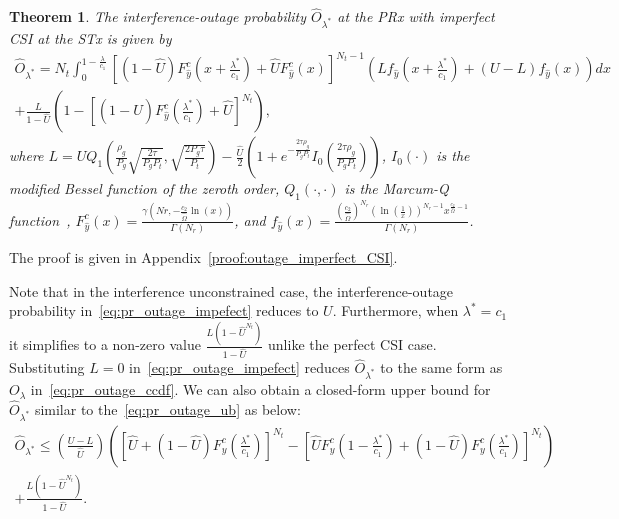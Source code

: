 \documentclass[12pt,draftcls,peerreview,onecolumn]{IEEEtran}
\newtheorem{theorem}{{\bf Theorem}}
\newcommand{\lam}{\lambda}
\newcommand{\lamstar}{\lam^{*}}
\newcommand{\Nt}{{N_t}}
\newcommand{\Nr}{{N_r}}
\newcommand{\Pt}{{P_t}}
\newcommand{\itau}{\tau}
\newcommand{\cone}{c_{1}}
\newcommand{\ctwo}{c_{2}}
\newcommand{\out}{O}
\newcommand{\m}{\cone}
\newcommand{\lambym}{\frac{\lam}{\m}}
\newcommand{\lamstarbym}{\frac{\lamstar}{\m}}
\newcommand{\al}{\ctwo}
\newcommand{\snr}{\Omega}
\newcommand{\un}{U}
\newcommand{\outlam}{\out_{\lam}}
\newcommand{\outhatlamstar}{\widehat{\out}_{\lam^*}}
\newcommand{\unhat}{\widehat{\un}}
\newcommand{\snrhat}{\widehat{\snr}}
\newcommand{\gpilotpower}{P_g}
\newcommand{\yhat}{\hat{y}}
\newcommand{\Probglt}{L}
\newcommand{\albysnrhat}[1][]{\frac{\al#1}{\snrhat}}
\newcommand{\rhog}{\rho_g}
\begin{document}
\begin{theorem}
\label{thm:outage_imperfect_CSI}
The interference-outage probability $\outhatlamstar$ at the PRx with imperfect CSI at the STx is given by
\begin{multline}
\label{eq:pr_outage_impefect} 
\!\outhatlamstar \!=\! \Nt \!\int_{0}^{1-\lambym} 	
\!\left[\left(1 -\unhat\right)F_{\yhat}^{c}\left(x+\lamstarbym\right) + \unhat F_{\yhat}^{c}\left(x\right)\right]^{\Nt-1}\!\! \left(\! \Probglt f_{\yhat}\!\left(\! x+\lamstarbym\right) \!+\! (\un - \Probglt) f_{\yhat}\left(x\right)\!\right) dx\\
+ \frac{ \Probglt}{1 - \unhat} \left( 1 - \left[ \left(1 -\unhat\right)F_{\yhat}^{c}\left(\lamstarbym\right) + \unhat \right]^{\Nt}  \right) ,
\end{multline}
%
where $\Probglt = \un Q_1\left(\frac{\rhog}{ \gpilotpower} \sqrt{\frac{2\itau}{ \gpilotpower\Pt}},\sqrt{\frac{2 \gpilotpower\itau}{\Pt}}\right)  - \frac{\unhat}{2} \left( 1 + e^{-\frac{2\itau\rhog}{ \gpilotpower\Pt}}I_{0}\left(\frac{2\itau\rhog}{ \gpilotpower\Pt} \right) \right)$, $I_{0}(\cdot)$ is the modified Bessel function of the zeroth order,  $Q_1(\cdot,\cdot)$ is the Marcum-Q function~\cite[(4.34)]{simon_alouini_book}, $F_{\yhat}^{c}\left(x\right) = \frac{\gamma\left(Nr,-\albysnrhat[]\ln(x)\right)}{\Gamma(\Nr)}$, and $f_{\yhat}\left( x\right) = \frac{ \left( \albysnrhat \right)^{\Nr} \left(\ln\left(\frac{1}{x} \right)\right)^{\Nr-1} x^{\albysnrhat - 1}}{\Gamma(\Nr)}$.
\end{theorem}
%
\begin{IEEEproof}
	The proof is given in Appendix~\ref{proof:outage_imperfect_CSI}.
\end{IEEEproof}
%
Note that in the interference unconstrained case, the interference-outage probability in~\eqref{eq:pr_outage_impefect} reduces to $\un$. Furthermore, when $\lamstar=\cone$ it simplifies to a non-zero value $\frac{ \Probglt \left( 1-\unhat^{\Nt}\right) }{1-\unhat}$ unlike the perfect CSI case. Substituting $\Probglt=0$ in~\eqref{eq:pr_outage_impefect} reduces $\outhatlamstar$ to the same form as $\outlam$ in~\eqref{eq:pr_outage_ccdf}.
We can also obtain a closed-form upper bound for $\outhatlamstar$ similar to the~\eqref{eq:pr_outage_ub} as below: 
\begin{multline}
\label{eq:pr_outage_imperfect_ub}
\outhatlamstar  \leq \left(\frac{\un - \Probglt}{\unhat}\right)\left( \left[\unhat + \left(1-\unhat\right)F_{y}^{c}\left(\lamstarbym\right)\right]^{\Nt} - \left[ \unhat F_{y}^{c}\left(1-\lamstarbym\right) + \left(1-\unhat\right)F_{y}^{c}\left(\lamstarbym\right)  \right]^{\Nt}\right) \\
+  \frac{ \Probglt \left( 1-\unhat^{\Nt}\right) }{1-\unhat}  .
\end{multline}
\end{document}
